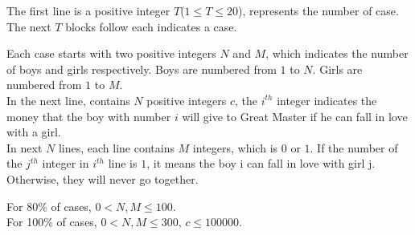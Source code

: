 The first line is a positive integer $T$($1 \leq T \leq 20$), represents the number of case. The next $T$ blocks follow each indicates a case.

Each case starts with two positive integers $N$ and $M$, which indicates the number of boys and girls respectively. Boys are numbered from $1$ to $N$. Girls are numbered from $1$ to $M$.\\
In the next line, contains $N$ positive integers $c$, the $i^{th}$ integer indicates the money that the boy with number $i$ will give to Great Master if he can fall in love with a girl.\\
In next $N$ lines, each line contains $M$ integers, which is $0$ or $1$. If the number of the $j^{th}$ integer in $i^{th}$ line is $1$, it means the boy i can fall in love with girl j. Otherwise, they will never go together.

For 80\% of cases, $0 < N,M \leq 100$.\\
For 100\% of cases, $0 < N,M \leq 300$, $c \leq 100000$.